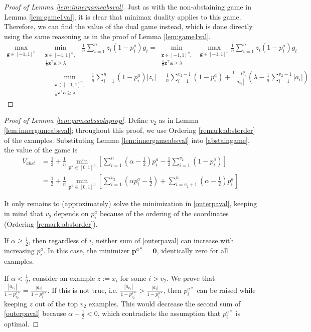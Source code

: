 \documentclass{article}[12pt]
\theoremstyle{named}
\newcommand{\va}{\mathbf{a}}
\newcommand{\vg}{\mathbf{g}}    %
\newcommand{\vp}{\mathbf{p}}
\newcommand{\vz}{\mathbf{z}}
\newcommand{\vzero}{\mathbf{0}}
\newcommand{\abs}[1]{\left| #1 \right|}
\newcommand{\lrp}[1]{\left(#1\right)}
\begin{document}
\begin{proof}[Proof of Lemma \ref{lem:innergameabsval}]
Just as with the non-abstaining game in Lemma \ref{lem:game1val}, 
it is clear that minimax duality applies to this game. 
Therefore, we can find the value of the dual game instead, 
which is done directly using the same reasoning as in the proof of Lemma \ref{lem:game1val}. 
\begin{align*}
\max_{\vg \in [-1,1]^n} &\min_{\substack{ \vz \in [-1,1]^n , \\ \frac{1}{n} \vz^\top \va \geq \lambda }}\; \frac{1}{n} \sum_{i=1}^n z_i \lrp{1 - p_i^a} g_i 
= \min_{\substack{ \vz \in [-1,1]^n , \\ \frac{1}{n} \vz^\top \va \geq \lambda }}\; \max_{\vg \in [-1,1]^n} \frac{1}{n} \sum_{i=1}^n z_i \lrp{1 - p_i^a} g_i \\
&= \min_{\substack{ \vz \in [-1,1]^n , \\ \frac{1}{n} \vz^\top \va \geq \lambda }}\; \frac{1}{n} \sum_{i=1}^n \lrp{1 - p_i^a} \abs{z_i} 
= \frac{1}{n} \sum_{i=1}^{v_2 - 1} \lrp{1 - p_i^a} + \frac{1 - p_{v_2}^a}{\abs{a_{v_2}}} \lrp{ \lambda - \frac{1}{n} \sum_{i=1}^{v_2 - 1} \abs{a_i} }
\end{align*}
\end{proof}



\begin{proof}[Proof of Lemma \ref{lem:gameabssolnprop}]
Define $v_2$ as in Lemma \ref{lem:innergameabsval}; 
throughout this proof, we use Ordering \ref{remark:abstorder} of the examples. 
Substituting Lemma \ref{lem:innergameabsval} into \eqref{abstaingame}, 
the value of the game is
\begin{align}
\label{outerpaval}
V_{abst} &= \frac{1}{2} + \frac{1}{n} \min_{\vp^a \in [0,1]^n} \left[ \sum_{i=1}^n \lrp{ \alpha - \frac{1}{2}} p_i^a - \frac{1}{2} \sum_{i=1}^{v_2} \lrp{1 - p_i^a} \right] \nonumber \\
&= \frac{1}{2} + \frac{1}{n} \min_{\vp^a \in [0,1]^n} \left[ \sum_{i=1}^{v_2} \lrp{ \alpha p_i^a - \frac{1}{2} } + \sum_{i=v_2+1}^n \lrp{ \alpha - \frac{1}{2}} p_i^a\right]
\end{align}

It only remains to (approximately) solve the minimization in \eqref{outerpaval}, 
keeping in mind that $v_2$ depends on $p_i^a$ because of the ordering of the coordinates (Ordering \ref{remark:abstorder}). 

If $\alpha \geq \frac{1}{2}$, then regardless of $i$, 
neither sum of \eqref{outerpaval} can increase with increasing $p_i^a$. 
In this case, the minimizer $\vp^{a*} = \vzero$, identically zero for all examples. 

If $\alpha < \frac{1}{2}$, 
consider an example $z := x_i$ for some $i > v_2$. 
We prove that 
$\frac{\abs{a_{v_2} }}{1 - p_{v_2}^{a*}} = \frac{\abs{a_i }}{1 - p_{i}^{a*}}$. 
If this is not true, i.e. $\frac{\abs{a_{v_2} }}{1 - p_{v_2}^{a*}} > \frac{\abs{a_i }}{1 - p_{i}^{a*}}$, 
then $p_i^{a*}$ can be raised while keeping $z$ out of the top $v_2$ examples. 
This would decrease the second sum of \eqref{outerpaval} because $\alpha - \frac{1}{2} < 0$, 
which contradicts the assumption that $p_i^{a*}$ is optimal.
\end{proof}
\end{document}
